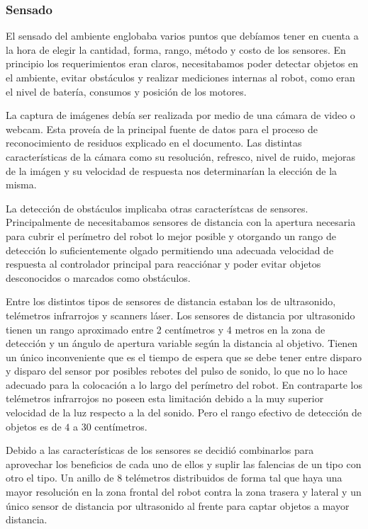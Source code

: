 \subsubsection{Sensado}

El sensado del ambiente englobaba varios puntos que deb\'iamos tener en cuenta a la hora de elegir la cantidad, forma, rango, m\'etodo y costo
de los sensores. En principio los requerimientos eran claros, necesitabamos poder detectar objetos en el ambiente, evitar obst\'aculos y realizar
mediciones internas al robot, como eran el nivel de bater\'ia, consumos y posici\'on de los motores.

La captura de im\'agenes deb\'ia ser realizada por medio de una c\'amara de video o webcam. Esta prove\'ia de la principal fuente de datos para
el proceso de reconocimiento de residuos explicado en el documento. Las distintas caracter\'isticas de la c\'amara como su resoluci\'on, refresco,
nivel de ruido, mejoras de la im\'agen y su velocidad de respuesta nos determinar\'ian la elecci\'on de la misma.

La detecci\'on de obst\'aculos implicaba otras caracter\'istcas de sensores. Principalmente de necesitabamos sensores de distancia con la apertura
necesaria para cubrir el per\'imetro del robot lo mejor posible y otorgando un rango de detecci\'on lo suficientemente olgado permitiendo una adecuada
velocidad de respuesta al controlador principal para reacci\'onar y poder evitar objetos desconocidos o marcados como obst\'aculos.

Entre los distintos tipos de sensores de distancia estaban los de ultrasonido, tel\'emetros infrarrojos y scanners l\'aser. Los sensores de distancia
por ultrasonido tienen un rango aproximado entre 2 cent\'imetros y 4 metros en la zona de detecci\'on y un \'angulo de apertura variable seg\'un la
distancia al objetivo. Tienen un \'unico inconveniente que es el tiempo de espera que se debe tener entre disparo y disparo del sensor por posibles
rebotes del pulso de sonido, lo que no lo hace adecuado para la colocaci\'on a lo largo del per\'imetro del robot. En contraparte los tel\'emetros 
infrarrojos no poseen esta limitaci\'on debido a la muy superior velocidad de la luz respecto a la del sonido. Pero el rango efectivo de detecci\'on
de objetos es de $4$ a $30$ cent\'imetros.

Debido a las caracter\'isticas de los sensores se decidi\'o combinarlos para aprovechar los beneficios de cada uno de ellos y suplir las falencias
de un tipo con otro el tipo. Un anillo de 8 tel\'emetros distribuidos de forma tal que haya una mayor resoluci\'on en la zona frontal del robot
contra la zona trasera y lateral y un \'unico sensor de distancia por ultrasonido al frente para captar objetos a mayor distancia.

